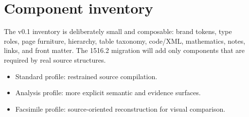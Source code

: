 \documentclass{requirements-lab}
\begin{document}
\appendix
\section{Component inventory}
\RLAccentRule
\RLBodyFont
The v0.1 inventory is deliberately small and composable: brand tokens, type roles, page furniture, hierarchy, table taxonomy, code/XML, mathematics, notes, links, and front matter. The 1516.2 migration will add only components that are required by real source structures.

\begin{itemize}
    \item Standard profile: restrained source compilation.
    \item Analysis profile: more explicit semantic and evidence surfaces.
    \item Facsimile profile: source-oriented reconstruction for visual comparison.
\end{itemize}
\end{document}
